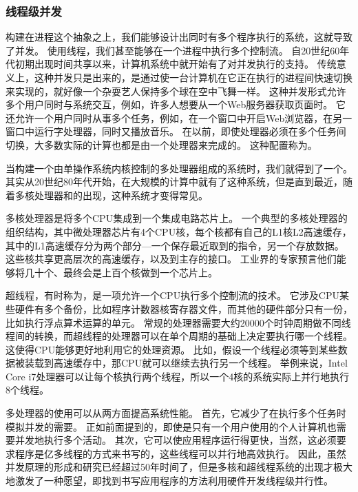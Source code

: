 {{        \subsubsection{线程级并发}
        {
            构建在进程这个抽象之上，我们能够设计出同时有多个程序执行的系统，这就导致了并发。
            使用线程，我们甚至能够在一个进程中执行多个控制流。
            自20世纪60年代初期出现时间共享以来，计算机系统中就开始有了对并发执行的支持。
            传统意义上，这种并发只是出来的，是通过使一台计算机在它正在执行的进程间快速切换来实现的，就好像一个杂耍艺人保持多个球在空中飞舞一样。
            这种并发形式允许多个用户同时与系统交互，例如，许多人想要从一个Web服务器获取页面时。
            它还允许一个用户同时从事多个任务，例如，在一个窗口中开启Web浏览器，在另一窗口中运行字处理器，同时又播放音乐。
            在以前，即使处理器必须在多个任务间切换，大多数实际的计算也都是由一个处理器来完成的。
            这种配置称为。

            当构建一个由单操作系统内核控制的多处理器组成的系统时，我们就得到了一个。
            其实从20世纪80年代开始，在大规模的计算中就有了这种系统，但是直到最近，随着多核处理器和的出现，这种系统才变得常见。

            多核处理器是将多个CPU集成到一个集成电路芯片上。
            一个典型的多核处理器的组织结构，其中微处理器芯片有4个CPU核，每个核都有自己的L1核L2高速缓存，其中的L1高速缓存分为两个部分---一个保存最近取到的指令，另一个存放数据。
            这些核共享更高层次的高速缓存，以及到主存的接口。
            工业界的专家预言他们能够将几十个、最终会是上百个核做到一个芯片上。

            超线程，有时称为，是一项允许一个CPU执行多个控制流的技术。
            它涉及CPU某些硬件有多个备份，比如程序计数器核寄存器文件，而其他的硬件部分只有一份，比如执行浮点算术运算的单元。
            常规的处理器需要大约20000个时钟周期做不同线程间的转换，而超线程的处理器可以在单个周期的基础上决定要执行哪一个线程。
            这使得CPU能够更好地利用它的处理资源。
            比如，假设一个线程必须等到某些数据被装载到高速缓存中，那CPU就可以继续去执行另一个线程。
            举例来说，Intel Core i7处理器可以让每个核执行两个线程，所以一个4核的系统实际上并行地执行8个线程。

            多处理器的使用可以从两方面提高系统性能。
            首先，它减少了在执行多个任务时模拟并发的需要。
            正如前面提到的，即使是只有一个用户使用的个人计算机也需要并发地执行多个活动。
            其次，它可以使应用程序运行得更快，当然，这必须要求程序是亿多线程的方式来书写的，这些线程可以并行地高效执行。
            因此，虽然并发原理的形成和研究已经超过50年时间了，但是多核和超线程系统的出现才极大地激发了一种愿望，即找到书写应用程序的方法利用硬件开发线程级并行性。
        }

}}
